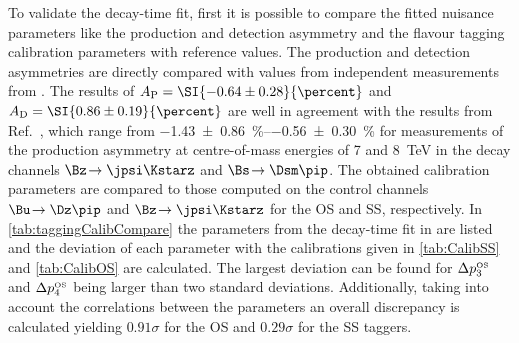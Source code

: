 To validate the decay-time fit, first it is possible to compare the fitted nuisance parameters like the production and detection asymmetry and the flavour tagging calibration parameters with reference values.
The production and detection asymmetries are directly compared with values from independent measurements from \lhcb.
The results of $A_{\text{P}}=\SI{-0.64\pm0.28}{\percent}$ and $A_{\text{D}}=\SI{0.86\pm0.19}{\percent}$ are well in agreement with the results from Ref.~\cite{Aaij:2017mso}, which \eg range from \SIrange{-1.43\pm0.86}{-0.56\pm0.30}{\percent} for measurements of the production asymmetry at centre-of-mass energies of \num{7} and \SI{8}{\tera\electronvolt} in the decay channels $\Bz\!\to\jpsi\Kstarz$ and $\Bs\!\to\Dsm\pip$.
The obtained calibration parameters are compared to those computed on the control channels $\Bu\!\to\Dz\pip$ and $\Bz\!\to\jpsi\Kstarz$ for the OS and SS, respectively.
In \cref{tab:taggingCalibCompare} the parameters from the decay-time fit in \BdToDpi are listed and the deviation of each parameter with the calibrations given in \cref{tab:CalibSS} and \cref{tab:CalibOS} are calculated.
The largest deviation can be found for $\Delta p_{3}^{\text{\tiny OS}}$ and $\Delta p_{4}^{\text{\tiny OS}}$ being larger than two standard deviations.
Additionally, taking into account the correlations between the parameters an overall discrepancy is calculated yielding $0.91\sigma$ for the OS and $0.29\sigma$ for the SS taggers.
